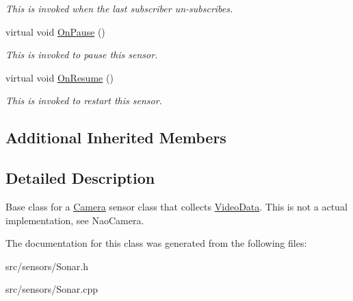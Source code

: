 \begin{DoxyCompactItemize}
\begin{DoxyCompactList}\small\item\em This is invoked when the last subscriber un-\/subscribes. \end{DoxyCompactList}\item 
\mbox{\label{class_sonar_a2040459f0005b4829915b8e28461fd9b}} 
virtual void \hyperlink{class_sonar_a2040459f0005b4829915b8e28461fd9b}{On\+Pause} ()
\begin{DoxyCompactList}\small\item\em This is invoked to pause this sensor. \end{DoxyCompactList}\item 
\mbox{\label{class_sonar_a48121118d78a726608c85c94b89a2ba8}} 
virtual void \hyperlink{class_sonar_a48121118d78a726608c85c94b89a2ba8}{On\+Resume} ()
\begin{DoxyCompactList}\small\item\em This is invoked to restart this sensor. \end{DoxyCompactList}\end{DoxyCompactItemize}
\subsection*{Additional Inherited Members}


\subsection{Detailed Description}
Base class for a \hyperlink{class_camera}{Camera} sensor class that collects \hyperlink{class_video_data}{Video\+Data}. This is not a actual implementation, see Nao\+Camera. 

The documentation for this class was generated from the following files\+:\begin{DoxyCompactItemize}
\item 
src/sensors/Sonar.\+h\item 
src/sensors/Sonar.\+cpp\end{DoxyCompactItemize}
